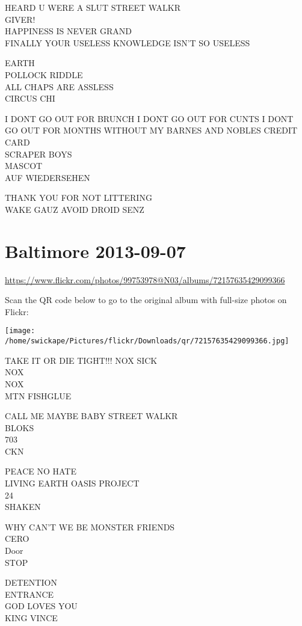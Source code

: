 \documentclass[10pt,letterpaper]{article}
\begin{document}
HEARD U WERE A SLUT STREET WALKR\\
GIVER!\\
HAPPINESS IS NEVER GRAND\\
FINALLY YOUR USELESS KNOWLEDGE ISN'T SO USELESS

EARTH\\
POLLOCK RIDDLE\\
ALL CHAPS ARE ASSLESS\\
CIRCUS CHI

I DONT GO OUT FOR BRUNCH I DONT GO OUT FOR CUNTS I DONT GO OUT FOR MONTHS WITHOUT MY BARNES AND NOBLES CREDIT CARD\\
SCRAPER BOYS\\
MASCOT\\
AUF WIEDERSEHEN

THANK YOU FOR NOT LITTERING\\
WAKE GAUZ AVOID DROID SENZ


\section*{Baltimore 2013-09-07}

\url{https://www.flickr.com/photos/99753978@N03/albums/72157635429099366}

Scan the QR code below to go to the original album with full-size photos on Flickr:

\texttt{[image: /home/swickape/Pictures/flickr/Downloads/qr/72157635429099366.jpg]}


TAKE IT OR DIE TIGHT!!! NOX SICK\\
NOX\\
NOX\\
MTN FISHGLUE

CALL ME MAYBE BABY STREET WALKR\\
BLOKS\\
703\\
CKN

PEACE NO HATE\\
LIVING EARTH OASIS PROJECT\\
24\\
SHAKEN

WHY CAN'T WE BE MONSTER FRIENDS\\
CERO\\
Door\\
STOP

DETENTION\\
ENTRANCE\\
GOD LOVES YOU\\
KING VINCE
\end{document}
